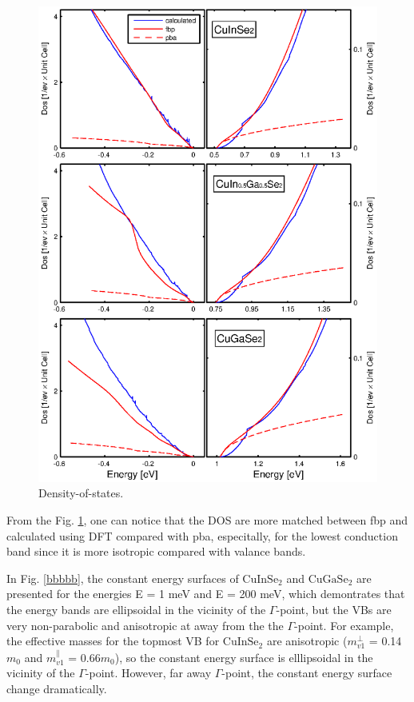 \documentclass[a4paper, 12pt, titlepage,oneside,drop]{kthesis}
\begin{document}
\begin{figure}[H]
\begin{center}
\includegraphics[scale=0.7]{figure5_clas.eps}
\caption{Density-of-states.}
\label{dos}
\end{center}
\end{figure}

From the Fig. \ref{dos}, one can notice that the DOS are more matched between fbp and calculated using DFT compared with pba, especitally, for the lowest conduction band since it is more isotropic compared
with valance bands.

In Fig. \ref{bbbbb}, the constant energy surfaces of ${\mathrm{ CuInSe_2}}$ and ${\mathrm{ CuGaSe_2}}$ are presented for the energies E = 1 meV 
and E = 200 meV, which demontrates that the energy bands are ellipsoidal in the vicinity of the $\Gamma$-point, but the VBs are very
non-parabolic and anisotropic at away from the the $\Gamma$-point. For example, the effective masses for the topmost VB for ${\mathrm{ CuInSe_2}}$  are anisotropic
($m^{\perp}_{v1}$ = 0.14$m_0$ and $m^{\parallel}_{v1}$ = 0.66$m_0$), so the constant energy surface is elllipsoidal in the vicinity of the  $\Gamma$-point. However,
far away $\Gamma$-point, the constant energy surface change dramatically. 
 
\end{document}
